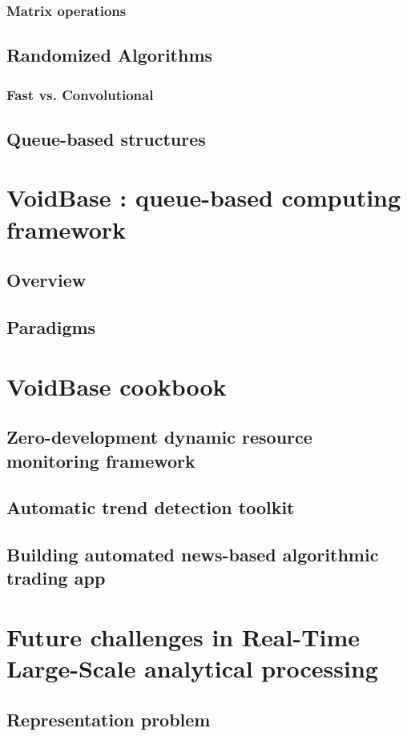 \documentclass[]{book}    %
\begin{document}
\subsection{Matrix operations}

\section{Randomized Algorithms}
\subsection{Fast vs. Convolutional}
\section{Queue-based structures}

\chapter{VoidBase : queue-based computing framework}
\section{Overview}
\section{Paradigms}

\chapter{VoidBase cookbook}
\section{Zero-development dynamic resource monitoring framework}
\section{Automatic trend detection toolkit}
\section{Building automated news-based algorithmic trading app}

\chapter{Future challenges in Real-Time Large-Scale analytical processing}
\section{Representation problem}
\end{document}
